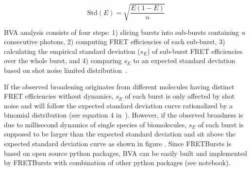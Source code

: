 \begin{equation}
\label{eq:binom_std}
\operatorname{Std(\textit{E})} = {\sqrt{\frac{E(1 - E)}{n}}}
\end{equation}


BVA analysis consists of four steps: 1) slicing bursts into sub-bursts containing \textit{n} consecutive photons, 2) computing FRET efficiencies of each sub-burst, 3) calculating the empirical standard deviation ($s_E$) of sub-burst FRET efficiencies over the whole burst, and 4) comparing $s_E$ to an expected standard deviation based on shot noise limited distribution~\cite{Torella_2011}. 

If the observed broadening originates from different molecules having distinct FRET efficiencies without dynamics, $s_E$ of each burst is only affected by shot noise and will follow the expected standard deviation curve rationalized by a binomial distribution (see equation 4 in~\cite{Torella_2011}). However, if the observed broadness is due to millisecond dynamics of single species of biomolecules, $s_E$ of each burst is supposed to be larger than the expected standard deviation and sit above the expected standard deviation curve as shown in figure .
Since FRETBursts is based on open source python packages, BVA can be easily built and implemented by FRETBursts with combination of other python packages (see notebook).  
